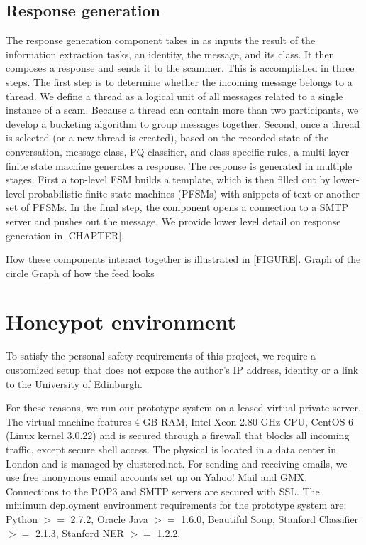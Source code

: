 \subsection*{Response generation}
The response generation component takes in as inputs the result of the information extraction tasks, an identity, the message, and its class. It then composes a response and sends it to the scammer. This is accomplished in three steps. The first step is to determine whether the incoming message belongs to a thread. We define a thread as a logical unit of all messages related to a single instance of a scam. Because a thread can contain more than two participants, we develop a bucketing algorithm to group messages together. Second, once a thread is selected (or a new thread is created), based on the recorded state of the conversation, message class, PQ classifier, and class-specific rules, a multi-layer finite state machine generates a response. The response is generated in multiple stages. First a top-level FSM builds a template, which is then filled out by lower-level probabilistic finite state machines (PFSMs) with snippets of text or another set of PFSMs. In the final step, the component opens a connection to a SMTP server and pushes out the message. We provide lower level detail on response generation in [CHAPTER].

How these components interact together is illustrated in [FIGURE].
Graph of the circle 
Graph of how the feed looks

\section{Honeypot environment}

To satisfy the personal safety requirements of this project, we require a customized setup that does not expose the author's IP address, identity or a link to the University of Edinburgh.

For these reasons, we run our prototype system on a leased virtual private server. The virtual machine features 4 GB RAM, Intel Xeon 2.80 GHz CPU, CentOS 6 (Linux kernel 3.0.22) and is secured through a firewall that blocks all incoming traffic, except secure shell access. The physical  is located in a data center in London and is managed by clustered.net. For sending and receiving emails, we use free anonymous email accounts set up on Yahoo! Mail and GMX. Connections to the POP3 and SMTP servers are secured with SSL. The minimum deployment environment requirements for the prototype system are: Python $>=$ 2.7.2, Oracle Java $>=$ 1.6.0, Beautiful Soup, Stanford Classifier $>=$ 2.1.3, Stanford NER $>=$ 1.2.2. 
